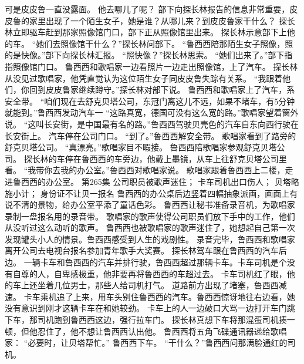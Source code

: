 \documentclass[a4paper,12pt,UTF8,twoside]{ctexbook}
\begin{document}
        可是皮皮鲁一直没露面。  
        他去哪儿了呢？  
        部下向探长林报告的信息非常重要，皮皮鲁的家里出现了一个陌生女子，她是谁？从哪儿来？到皮皮鲁家干什么？  
        探长林立即驱车赶到那家照像馆门口，部下正从照像馆里出来。  
        探长林示意部下上他的车。  
        “她们去照像馆干什么？”探长林问部下。  
        “鲁西西陪那陌生女子照像，照的是快像。”部下向探长林汇报。  
        “照快像？”探长林思索。  
        “她们出来了。”部下指指照像馆门口。  
        鲁西西和歌唱家一边看照片一边走出照像馆，上了汽车。  
        探长林从没见过歌唱家，他凭直觉认为这位陌生女子同皮皮鲁失踪有关系。  
        “我跟着他们，你回到皮皮鲁家继续蹲守。”探长林对部下说。  
        鲁西西和歌唱家上了汽车，系安全带。  
        “咱们现在去舒克贝塔公司，东冠门离这儿不远，如果不堵车，有5分钟就能到。”鲁西西发动汽车一  
        “这路真宽，德国可没有这么宽的路。”歌唱家望着窗外说。  
        “这叫长安街，是中国最有名的路。”鲁西西驾驶贝壳色的汽车自东向西行驶在长安街上。  
        汽车停在公司门口。  
        “到了。”鲁西西解安全带。  
        歌唱家看到了路旁的舒克贝塔公司。  
        “真漂亮。”歌唱家目不暇接。  
        鲁西西陪歌唱家参观舒克贝塔公司。  
        探长林的车停在鲁西西的车旁边，他戴上墨镜，从车上往舒克贝塔公司里看。  
        “我带你去我的办公室。”鲁西西对歌唱家说。  
        歌唱家跟着鲁西西上二楼，走进鲁西西的办公室。          第265集  
        公司职员被歌声迷住；  
        卡车司机出口伤人；  
        贝塔略施小计；  
        身份证不让贝一报名    
        鲁西西的办公桌后边竖着四幅抽象派画，画面上有说不清的景物，给办公室平添了童话色彩。  
        鲁西西让秘书准备录音机，为歌唱家录制一盘报名用的录音带。  
        歌唱家的歌声使得公司职员们放下手中的工作，他们从没听过这么动听的歌声。  
        鲁西西也被歌唱家的歌声迷住了，她想起自己第一次发现罐头小人的情景。鲁西西感受到人生的戏剧性。  
        录音完毕，鲁西西和歌唱家离开公司去电视台报名参加青年歌手大奖赛。        
        探长林驾车跟在鲁西西的汽车后边。  
        一辆卡车和鲁西西的汽车并排行驶，鲁西西超过那辆卡车。卡车司机是个没有自尊的人，自卑感极重，他非要再将鲁西西的车超过去。  
        卡车司机红了眼，他的车上还坐着几位男士，那些人给司机打气。  
        道路前方出现了堵塞，鲁西西减速。  
        卡车乘机追了上来，用车头别住鲁西西的汽车。鲁西西惊讶地往右边看，她没有意识到刚才这辆卡车在和她较劲。  
        卡车上的人一边破口大骂一边打开车门跳下车，那司机跑到鲁西西这边，强行拉车门。  
        探长林真想下车将那混蛋司机揍一顿，但他忍住了，他不想让鲁西西认出他。  
        鲁西西将五角飞碟通讯器递给歌唱家：  
        “必要时，让贝塔帮忙。”  
        鲁西西下车。  
        “干什么？”鲁西西问那满脸通红的司机。  
\end{document}
